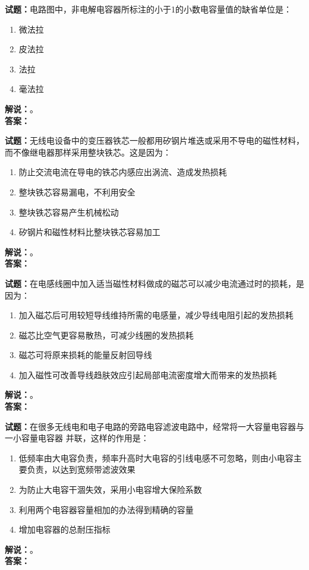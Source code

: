 \documentclass{ctexbook}
\begin{document}
\vspace{\baselineskip}

\noindent\textbf{试题：}电路图中，非电解电容器所标注的小于1的小数电容量值的缺省单位是：
\begin{enumerate}[leftmargin=3em]
  \item 微法拉
  \item 皮法拉
  \item 法拉
  \item 毫法拉
\end{enumerate}
\noindent\textbf{解说：}\textbf{}。\\\noindent\textbf{答案：}

\vspace{\baselineskip}

\noindent\textbf{试题：}无线电设备中的变压器铁芯一般都用矽钢片堆迭或采用不导电的磁性材料，而不像继电器那样采用整块铁芯。这是因为：
\begin{enumerate}[leftmargin=3em]
  \item 防止交流电流在导电的铁芯内感应出涡流、造成发热损耗
  \item 整块铁芯容易漏电，不利用安全
  \item 整块铁芯容易产生机械松动
  \item 矽钢片和磁性材料比整块铁芯容易加工
\end{enumerate}
\noindent\textbf{解说：}\textbf{}。\\\noindent\textbf{答案：}

\vspace{\baselineskip}

\noindent\textbf{试题：}在电感线圈中加入适当磁性材料做成的磁芯可以减少电流通过时的损耗，是因为：
\begin{enumerate}[leftmargin=3em]
  \item 加入磁芯后可用较短导线维持所需的电感量，减少导线电阻引起的发热损耗
  \item 磁芯比空气更容易散热，可减少线圈的发热损耗
  \item 磁芯可将原来损耗的能量反射回导线
  \item 加入磁性可改善导线趋肤效应引起局部电流密度增大而带来的发热损耗
\end{enumerate}
\noindent\textbf{解说：}\textbf{}。\\\noindent\textbf{答案：}

\vspace{\baselineskip}

\noindent\textbf{试题：}在很多无线电和电子电路的旁路电容滤波电路中，经常将一大容量电容器与一小容量电容器 并联，这样的作用是：
\begin{enumerate}[leftmargin=3em]
  \item 低频率由大电容负责，频率升高时大电容的引线电感不可忽略，则由小电容主要负责，以达到宽频带滤波效果
  \item 为防止大电容干涸失效，采用小电容增大保险系数
  \item 利用两个电容器容量相加的办法得到精确的容量
  \item 增加电容器的总耐压指标
\end{enumerate}
\noindent\textbf{解说：}\textbf{}。\\\noindent\textbf{答案：}
\end{document}
